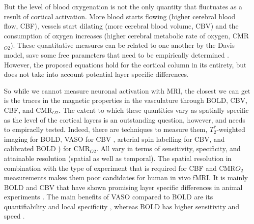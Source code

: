 But the level of blood oxygenation is not the only quantity that fluctuates as a result of cortical activation. More blood starts flowing (higher cerebral blood flow, CBF), vessels start dilating (more cerebral blood volume, CBV) and the consumption of oxygen increases (higher cerebral metabolic rate of oxygen, CMR$_{O2}$). These quantitative measures can be related to one another by the Davis model, save some free parameters that need to be empirically determined \cite{Davis1997}. However, the proposed equations hold for the cortical column in its entirety, but does not take into account potential layer specific differences. 

So while we cannot measure neuronal activation with MRI, the closest we can get is the traces in the magnetic properties in the vasculature through BOLD, CBV, CBF, and CMR$_{O2}$. The extent to which these quantities vary as spatially specific as the level of the cortical layers is an outstanding question, however, and needs to empiraclly tested. Indeed, there are techniques to measure them, $T_2^*$-weighted imaging \cite{Norris2006} for BOLD, VASO for CBV \cite{Huber2018}, arterial spin labelling \cite{Grade2015} for CBV, and calibrated BOLD \cite{Blockley2013}) for CMR$_{O2}$. All vary in terms of sensitivity, specificity, and attainable resolution (spatial as well as temporal). The spatial resolution in combination with the type of experiment that is required for CBF and CMR$O_2$ measurements makes them poor candidates for human in vivo fMRI. It is mainly BOLD and CBV that have shown promising layer specific differences in animal experiments \cite{Lu2004,Zhao2006,Jin2008,Goense2012}. The main benefits of VASO compared to BOLD are its quantifiability \cite{Lu2003} and local specificity \cite{Jin2006}, whereas BOLD has higher sensitivity and speed \cite{Huber2018}.

